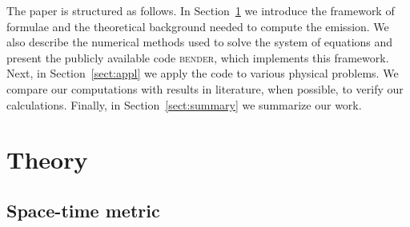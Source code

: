 \documentclass{aa}
\newcommand{\refedel}[1]{}
\begin{document}
The paper is structured as follows.
In Section~\ref{sect:theory} we introduce the framework of formulae and the theoretical background needed to compute the emission.
We also describe the numerical methods used to solve the system of equations and present the publicly available code \textsc{bender},%
which implements this framework.
Next, in Section~\ref{sect:appl} we apply the code to various physical problems.\refedel{, mostly related to AMPs.}
We compare our computations with results in literature, when possible, to verify our calculations.
Finally, in Section~\ref{sect:summary} we summarize our work.




\section{Theory}\label{sect:theory}
\subsection{Space-time metric}\label{sect:spacetime}
\end{document}
